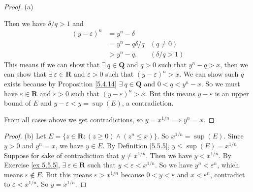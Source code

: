 \begin{proof}{(a)}
\begin{enumerate}[label=(\Roman*)]
              Then we have \(\delta / q > 1\) and
              \begin{align*}
                  (y - \varepsilon)^n & = y^n - \delta                          \\
                                      & = y^n - q \delta / q & (q \neq 0)       \\
                                      & > y^n - q.           & (\delta / q > 1)
              \end{align*}
              This means if we can show that \(\exists\ q \in \mathbf{Q}\) and \(q > 0\) such that \(y^n - q > x\), then we can show that \(\exists\ \varepsilon \in \mathbf{R}\) and \(\varepsilon > 0\) such that \((y - \varepsilon)^n > x\).
              We can show such \(q\) exists because by Proposition \ref{5.4.14} \(\exists\ q \in \mathbf{Q}\) and \(0 < q < y^n - x\).
              So we must have \(\varepsilon \in \mathbf{R}\) and \(\varepsilon > 0\) such that \((y - \varepsilon)^n > x\).
              But this means \(y - \varepsilon\) is an upper bound of \(E\) and \(y - \varepsilon < y = \sup(E)\), a contradiction.
    \end{enumerate}
    From all cases above we get contradictions, so \(y = x^{1 / n} \implies y^n = x\).
\end{proof}

\begin{proof}{(b)}
    Let \(E = \{z \in \mathbf{R} : (z \geq 0) \land (z^n \leq x)\}\).
    So \(x^{1 / n} = \sup(E)\).
    Since \(y > 0\) and \(y^n = x\), we have \(y \in E\).
    By Definition \ref{5.5.5}, \(y \leq \sup(E) = x^{1 / n}\).
    Suppose for sake of contradiction that \(y \neq x^{1 / n}\).
    Then we have \(y < x^{1 / n}\).
    By Exercise \ref{ex 5.5.5}, \(\exists\ \varepsilon \in \mathbf{R}\) such that \(y < \varepsilon < x^{1 / n}\).
    So we have \(y^n < \varepsilon^n\), which means \(\varepsilon \notin E\).
    But this means \(\varepsilon > x^{1 / n}\) because \(0 < y < \varepsilon\) and \(x < \varepsilon^n\), contradict to \(\varepsilon < x^{1 / n}\).
    So \(y = x^{1 / n}\).
\end{proof}

